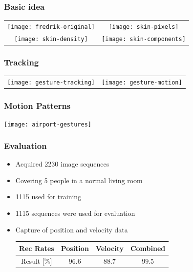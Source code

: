 \documentclass[10pt]{beamer}
\begin{document}
\begin{frame}
  \frametitle{Basic idea}
  \begin{center}
    \begin{tabular}[c]{cc}
      \texttt{[image: fredrik-original]} &
      \texttt{[image: skin-pixels]} \\
      \texttt{[image: skin-density]} &
      \texttt{[image: skin-components]}
    \end{tabular}
  \end{center}
\end{frame}

\begin{frame}
  \frametitle{Tracking}
  \begin{center}
    \begin{tabular}[c]{cc}
      \texttt{[image: gesture-tracking]} &
      \texttt{[image: gesture-motion]}
    \end{tabular}
  \end{center}
\end{frame}

\begin{frame}
  \frametitle{Motion Patterns}
  \begin{center}
    \texttt{[image: airport-gestures]}
  \end{center}
\end{frame}

\begin{frame}
  \frametitle{Evaluation}
  \begin{itemize}
  \item Acquired 2230 image sequences
  \item Covering 5 people in a normal living room
  \item 1115 used for training
  \item 1115 sequences were used for evaluation
  \item Capture of position and velocity data
    \begin{tabular}[c]{|c|c|c|c|}
      \hline
      Rec Rates & Position & Velocity & Combined \\ \hline\hline
      Result [\%]& 96.6 & 88.7 & 99.5 \\ \hline
    \end{tabular}
  \end{itemize}
\end{frame}
\end{document}
